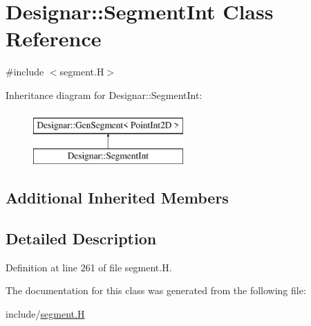 \hypertarget{class_designar_1_1_segment_int}{}\section{Designar\+:\+:Segment\+Int Class Reference}
\label{class_designar_1_1_segment_int}


{\ttfamily \#include $<$segment.\+H$>$}

Inheritance diagram for Designar\+:\+:Segment\+Int\+:\begin{figure}[H]
\begin{center}
\leavevmode
\includegraphics[height=2.000000cm]{class_designar_1_1_segment_int}
\end{center}
\end{figure}
\subsection*{Additional Inherited Members}


\subsection{Detailed Description}


Definition at line 261 of file segment.\+H.



The documentation for this class was generated from the following file\+:\begin{DoxyCompactItemize}
\item 
include/\hyperlink{segment_8_h}{segment.\+H}\end{DoxyCompactItemize}

